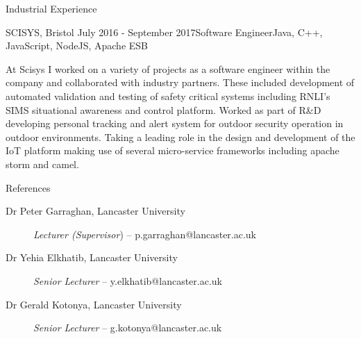 \documentclass{resume} %
\begin{document}
\begin{rSection}{Industrial Experience}
	\begin{rSubsection}{SCISYS, Bristol} {July 2016 - September 2017}{Software Engineer}{Java, C++, JavaScript, NodeJS, Apache ESB}
		\item [] At Scisys I worked on a variety of projects as a software engineer within the company and collaborated with industry partners. These included development of automated validation and testing of safety critical systems including RNLI's SIMS situational awareness and control platform. Worked as part of R\&D developing personal tracking and alert system for outdoor security operation in outdoor environments. Taking a leading role in the design and development of the IoT platform making use of several micro-service frameworks including apache storm and camel.
	\end{rSubsection}
\end{rSection}

\begin{rSection}{References}
	\begin{description}
		\item[Dr Peter Garraghan, Lancaster University]
		\textit{Lecturer (\textit{Supervisor}}) -- p.garraghan@lancaster.ac.uk
		\item[Dr Yehia Elkhatib, Lancaster University]
		\textit{Senior Lecturer} -- y.elkhatib@lancaster.ac.uk
		\item[Dr Gerald Kotonya, Lancaster University]
		\textit{Senior Lecturer} -- g.kotonya@lancaster.ac.uk
	\end{description}
\end{rSection}	
\end{document}
